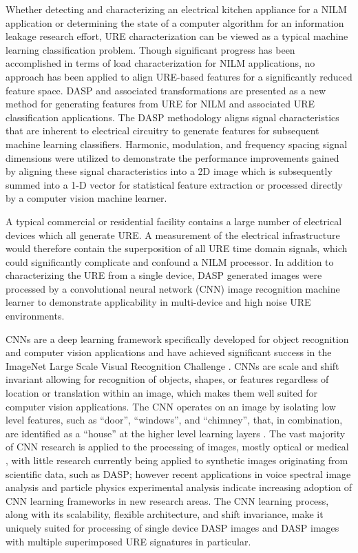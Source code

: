 Whether detecting and characterizing an electrical kitchen appliance for a NILM application or determining the state of a computer algorithm for an information leakage research effort, URE characterization can be viewed as a typical machine learning classification problem.  Though significant progress has been accomplished in terms of load characterization for NILM applications, no approach has been applied to align URE-based features for a significantly reduced feature space.  DASP and associated transformations are presented as a new method for generating features from URE for NILM and associated URE classification applications.  The DASP methodology aligns signal characteristics that are inherent to electrical circuitry to generate features for subsequent machine learning classifiers.  Harmonic, modulation, and frequency spacing signal dimensions were utilized to demonstrate the performance improvements gained by aligning these signal characteristics into a 2D image which is subsequently summed into a 1-D vector for statistical feature extraction or processed directly by a computer vision machine learner. 

A typical commercial or residential facility contains a large number of electrical devices which all generate URE.  A measurement of the electrical infrastructure would therefore contain the superposition of all URE time domain signals, which could significantly complicate and confound a NILM processor.  In addition to characterizing the URE from a single device, DASP generated images were processed by a convolutional neural network (CNN) image recognition machine learner to demonstrate applicability in multi-device and high noise URE environments.  

CNNs are a deep learning framework specifically developed for object recognition and computer vision applications \cite{Krizhevsky2012} and have achieved significant success in the ImageNet Large Scale Visual Recognition Challenge \cite{Simonyan2014, Szegedy2015, He2016}.  CNNs are scale and shift invariant \cite{Scherer2010} allowing for recognition of objects, shapes, or features regardless of location or translation within an image, which makes them well suited for computer vision applications.  The CNN operates on an image by isolating low level features, such as ``door'', ``windows'', and ``chimney'', that, in combination, are identified as a ``house'' at the higher level learning layers \cite{LeCun2015}.  The vast majority of CNN research is applied to the processing of images, mostly optical \cite{Simonyan2014, Szegedy2015, He2016} or medical \cite{Chen2017, Tajbakhsh2016}, with little research currently being applied to synthetic images originating from scientific data, such as DASP; however recent applications in voice spectral image analysis \cite{Qian2016} and particle physics experimental analysis \cite{Aurisano2016, Racah2016} indicate increasing adoption of CNN learning frameworks in new research areas.  The CNN learning process, along with its scalability, flexible architecture, and shift invariance, make it uniquely suited for processing of single device DASP images and DASP images with multiple superimposed URE signatures in particular.     


